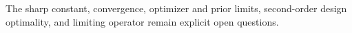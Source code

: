 The sharp constant, convergence, optimizer and prior limits, second-order design optimality, and limiting operator remain explicit open questions.